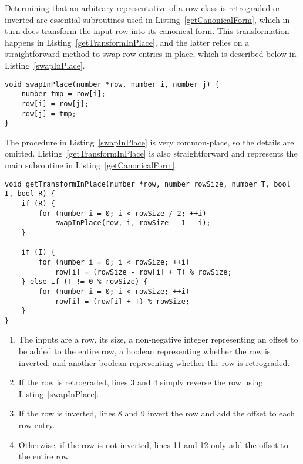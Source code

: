Determining that an arbitrary representative of a row class is retrograded or inverted are essential subroutines used in Listing~\ref{getCanonicalForm}, which in turn does transform the input row into its canonical form. This transformation happens in Listing~\ref{getTransformInPlace}, and the latter relies on a straightforward method to swap row entries in place, which is described below in Listing~\ref{swapInPlace}.

\begin{lstlisting}[caption={Swapping two entries in a row.},label={swapInPlace}]
void swapInPlace(number *row, number i, number j) {
    number tmp = row[i];
    row[i] = row[j];
    row[j] = tmp;
}
\end{lstlisting}

The procedure in Listing~\ref{swapInPlace} is very common-place, so the details are omitted. Listing~\ref{getTransformInPlace} is also straightforward and represents the main subroutine in Listing~\ref{getCanonicalForm}.

\begin{lstlisting}[caption={Transforming a row in place.},label={getTransformInPlace}]
void getTransformInPlace(number *row, number rowSize, number T, bool I, bool R) {
    if (R) {
        for (number i = 0; i < rowSize / 2; ++i)
            swapInPlace(row, i, rowSize - 1 - i);
    }

    if (I) {
        for (number i = 0; i < rowSize; ++i)
            row[i] = (rowSize - row[i] + T) % rowSize;
    } else if (T != 0 % rowSize) {
        for (number i = 0; i < rowSize; ++i)
            row[i] = (row[i] + T) % rowSize;
    }
}
\end{lstlisting}

\begin{enumerate}
\item The inputs are a row, its size, a non-negative integer representing an offset to be added to the entire row, a boolean representing whether the row is inverted, and another boolean representing whether the row is retrograded.
\addtocounter{enumi}{1}
\item If the row is retrograded, lines 3 and 4 simply reverse the row using Listing~\ref{swapInPlace}.
\addtocounter{enumi}{4}
\item If the row is inverted, lines 8 and 9 invert the row and add the offset to each row entry.
\addtocounter{enumi}{2}
\item Otherwise, if the row is not inverted, lines 11 and 12 only add the offset to the entire row.
\end{enumerate}

